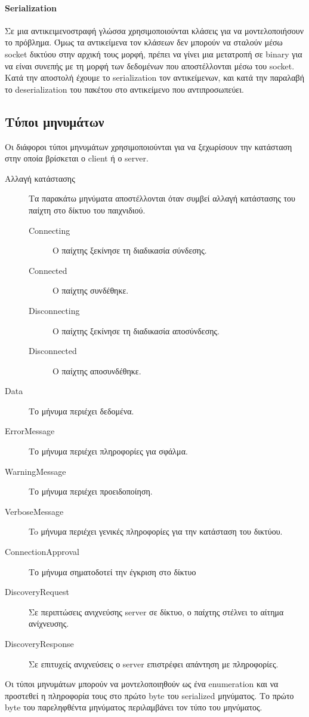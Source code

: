 		\paragraph{Serialization}
		Σε μια αντικειμενοστραφή γλώσσα χρησιμοποιούνται κλάσεις για να μοντελοποιήσουν το πρόβλημα. Όμως τα αντικείμενα τον κλάσεων δεν μπορούν να σταλούν μέσω socket δικτύου στην αρχική τους μορφή, πρέπει να γίνει μια μετατροπή σε binary για να είναι συνεπής με τη μορφή των δεδομένων που αποστέλλονται μέσω του socket. Κατά την αποστολή έχουμε το serialization τον αντικείμενων, και κατά την παραλαβή το deserialization του πακέτου στο αντικείμενο που αντιπροσωπεύει.
		\subsection{Τύποι μηνυμάτων}
		Οι διάφοροι τύποι μηνυμάτων χρησιμοποιούνται για να ξεχωρίσουν την κατάσταση στην οποία βρίσκεται ο client ή ο server.
			\begin{description}
				\item [Αλλαγή κατάστασης] Τα παρακάτω μηνύματα αποστέλλονται όταν συμβεί αλλαγή κατάστασης του παίχτη στο δίκτυο του παιχνιδιού.
				\begin{description}
					\item [Connecting] Ο παίχτης ξεκίνησε τη διαδικασία σύνδεσης.
					\item [Connected] Ο παίχτης συνδέθηκε.
					\item [Disconnecting] Ο παίχτης ξεκίνησε τη διαδικασία αποσύνδεσης.
					\item [Disconnected] Ο παίχτης αποσυνδέθηκε.
				\end{description}
				\item [Data] Το μήνυμα περιέχει δεδομένα.
				\item [ErrorMessage] Το μήνυμα περιέχει πληροφορίες για σφάλμα.
				\item [WarningMessage] Το μήνυμα περιέχει προειδοποίηση.
				\item [VerboseMessage] To μήνυμα περιέχει γενικές πληροφορίες για την κατάσταση του δικτύου.
				\item [ConnectionApproval] Το μήνυμα σηματοδοτεί την έγκριση στο δίκτυο
				\item [DiscoveryRequest] Σε περιπτώσεις ανιχνεύσης server σε δίκτυο, ο παίχτης στέλνει το αίτημα ανίχνευσης.
				\item [DiscoveryResponse] Σε επιτυχείς ανιχνεύσεις ο server επιστρέφει απάντηση με πληροφορίες. 
			\end{description}
		Οι τύποι μηνυμάτων μπορούν να μοντελοποιηθούν ως ένα enumeration και να προστεθεί η πληροφορία τους στο πρώτο byte του serialized μηνύματος. Το πρώτο byte του παρεληφθέντα μηνύματος περιλαμβάνει τον τύπο του μηνύματος.
		

